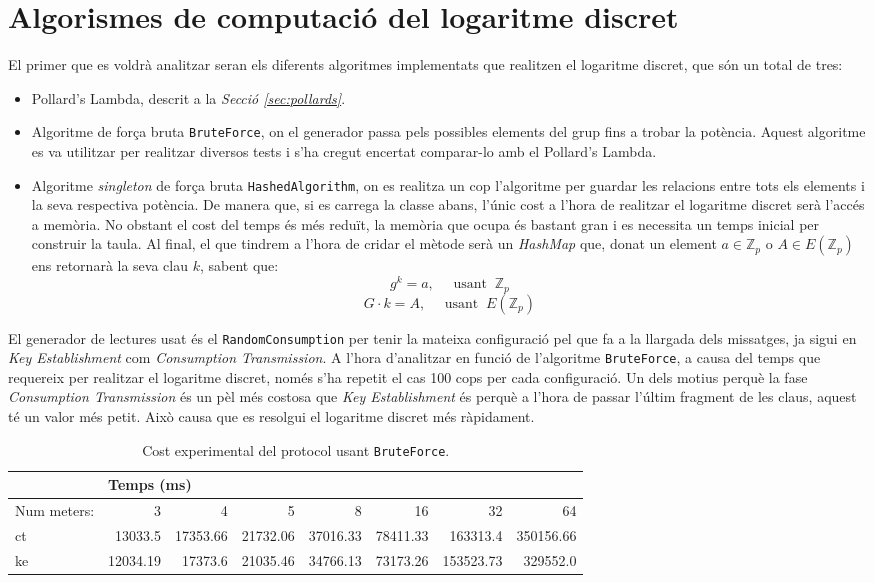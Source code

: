 \section{Algorismes de computació del logaritme discret}
El primer que es voldrà analitzar seran els diferents algoritmes implementats que realitzen el logaritme discret, que són un total de tres:
\begin{itemize}
	\item Pollard's Lambda, descrit a la \textit{Secció \ref{sec:pollards}}.
	\item Algoritme de força bruta \texttt{BruteForce}, on el generador passa pels possibles elements del grup fins a trobar la potència. Aquest algoritme es va utilitzar per realitzar diversos tests i s'ha cregut encertat comparar-lo amb el Pollard's Lambda.
	\item Algoritme \textit{singleton} de força bruta \texttt{HashedAlgorithm}, on es realitza un cop l'algoritme per guardar les relacions entre tots els elements i la seva respectiva potència. De manera que, si es carrega la classe abans, l'únic cost a l'hora de realitzar el logaritme discret serà l'accés a memòria. No obstant el cost del temps és més reduït, la memòria que ocupa és bastant gran i es necessita un temps inicial per construir la taula. Al final, el que tindrem a l'hora de cridar el mètode serà un \textit{HashMap} que, donat un element $a \in \mathbb{Z}_p$ o  $A \in E(\mathbb{Z}_p)$ ens retornarà la seva clau $k$, sabent que:
	\[g^k = a ,\quad \textrm{ usant  }\ \mathbb{Z}_p\]
	\[G \cdot k = A,\quad \textrm{ usant  }\ E(\mathbb{Z}_p)\]
\end{itemize}
El generador de lectures usat és el \texttt{RandomConsumption} per tenir la mateixa configuració pel que fa a la llargada dels missatges, ja sigui en \textit{Key Establishment} com \textit{Consumption Transmission}. 
A l'hora d'analitzar en funció de l'algoritme \texttt{BruteForce}, a causa del temps que requereix per realitzar el logaritme discret, només s'ha repetit el cas 100 cops per cada configuració. Un dels motius perquè la fase \textit{Consumption Transmission} és un pèl més costosa que \textit{Key Establishment} és perquè a l'hora de passar l'últim fragment de les claus, aquest té un valor més petit. Això causa que es resolgui el logaritme discret més ràpidament.
	\begin{table}[H]
		\centering
		\begin{tabular}{lrrrrrrr}
			\centering
			&\multicolumn{7}{l}{\centering Temps (ms)}\\
			\toprule
			Num meters: &           3  &       4  &           5  &            8  &            16 & 32 & 64\\
			\midrule
			ct &  13033.5 &  17353.66 &  21732.06 &  37016.33 &  78411.33 &   163313.4 &  350156.66 \\
			ke &  12034.19 &  17373.6 &  21035.46 &  34766.13 &  73173.26 &  153523.73 &  329552.0 \\
			\bottomrule
		\end{tabular}
		\caption{Cost experimental del protocol usant \texttt{BruteForce}.}
		\label{tab:brute}
	\end{table}
